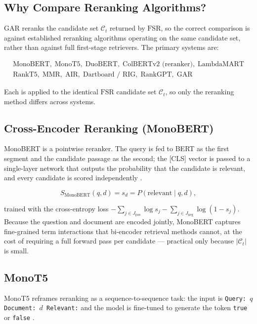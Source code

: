 \documentclass[11pt,a4paper]{article}
\begin{document}
\subsection{Why Compare Reranking Algorithms?}

GAR reranks the candidate set $\mathcal{C}_t$ returned by $\mathrm{FSR}$, so the correct comparison is against established reranking algorithms operating on the same candidate set, rather than against full first-stage retrievers. The primary systems are:

\[
\boxed{
\begin{array}{c}
\text{MonoBERT},\;
\text{MonoT5},\;
\text{DuoBERT},\;
\text{ColBERTv2 (reranker)},\;
\text{LambdaMART}\\
\text{RankT5},\;
\text{MMR},\;
\text{AIR},\;
\text{Dartboard / RIG},\;
\text{RankGPT},\;
\text{GAR}
\end{array}
}
\]

Each is applied to the identical $\mathrm{FSR}$ candidate set $\mathcal{C}_t$, so only the reranking method differs across systems.

\subsection{Cross-Encoder Reranking (MonoBERT)}

MonoBERT is a pointwise reranker. The query is fed to BERT as the first segment and the candidate passage as the second; the [CLS] vector is passed to a single-layer network that outputs the probability that the candidate is relevant, and every candidate is scored independently \citep{nogueira-cho-2019-passage,nogueira-etal-2019-multistage}.

\[
S_{\mathrm{MonoBERT}}(q,d)=s_d=P(\text{relevant}\mid q,d),
\]

trained with the cross-entropy loss $-\sum_{j\in J_{\mathrm{pos}}}\log s_j-\sum_{j\in J_{\mathrm{neg}}}\log(1-s_j)$. Because the question and document are encoded jointly, MonoBERT captures fine-grained term interactions that bi-encoder retrieval methods cannot, at the cost of requiring a full forward pass per candidate --- practical only because $|\mathcal{C}_t|$ is small.

\subsection{MonoT5}

MonoT5 reframes reranking as a sequence-to-sequence task: the input is \texttt{Query: $q$ Document: $d$ Relevant:} and the model is fine-tuned to generate the token \texttt{true} or \texttt{false} \citep{nogueira-etal-2020-document}.
\end{document}
